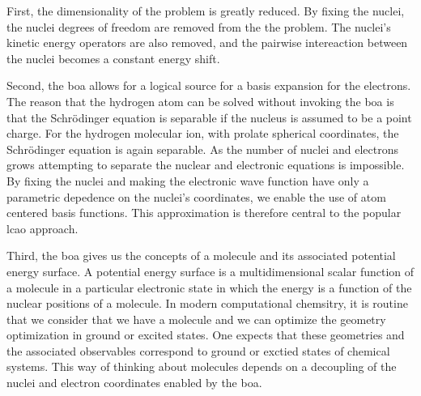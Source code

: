 First, the dimensionality of the problem is greatly reduced.
By fixing the nuclei, the nuclei degrees of freedom are removed from the the problem.
The nuclei's kinetic energy operators are also removed, and the pairwise intereaction between the nuclei becomes a constant energy shift.

Second, the \gls{boa} allows for a logical source for a basis expansion for the electrons.
The reason that the hydrogen atom can be solved without invoking the \gls{boa} is that the Schr{\"o}dinger equation is separable if the nucleus is assumed to be a point charge.
For the hydrogen molecular ion, with prolate spherical coordinates, the Schr{\"o}dinger equation is again separable.\cite{10.1088/0370-1328/71/5/312}
As the number of nuclei and electrons grows attempting to separate the nuclear and electronic equations is impossible.
By fixing the nuclei and making the electronic wave function have only a parametric depedence on the nuclei's coordinates, we enable the use of atom centered basis functions.
This approximation is therefore central to the popular \gls{lcao} approach.

Third, the \gls{boa} gives us the concepts of a molecule and its associated potential energy surface.
A potential energy surface is a multidimensional scalar function of a molecule in a particular electronic state in which the energy is a function of the nuclear positions of a molecule.
In modern computational chemsitry, it is routine that we consider that we have a molecule and we can optimize the geometry optimization in ground or excited states.
One expects that these geometries and the associated observables correspond to ground or exctied states of chemical systems.
This way of thinking about molecules depends on a decoupling of the nuclei and electron coordinates enabled by the \gls{boa}.
